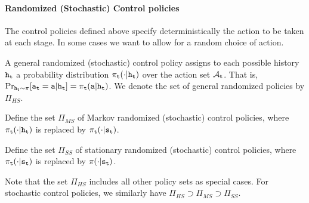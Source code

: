 \paragraph{Randomized (Stochastic) Control policies}
The control policies defined above specify deterministically the action to be taken at each stage. In some cases we want to allow for a random choice of action.

\begin{definition}
    A general randomized (stochastic) control policy assigns to each
possible history ${{\tt h}_{\tt t}}$ a probability distribution
${\pi _{\tt t}}( \cdot |{{\tt h}_{\tt t}})$ over the action set
${\mathcal{A}_{\tt t}}$. That is,  $\Pr_{{\tt h}_{\tt t}\sim \pi}[ {\tt a}_{\tt t} =
{\tt a}|{{\tt h}_{\tt t}}]  = {\pi
_{\tt t}}({\tt a}|{{\tt h}_{\tt t}})$. We denote the set of general
randomized policies by ${\Pi _{HS}}$.
\end{definition}
\begin{definition}
Define the set ${\Pi _{MS}}$ of Markov randomized (stochastic) control policies, where ${\pi _{\tt t}}( \cdot |{{\tt h}_{\tt t}})$ is replaced by ${\pi _{\tt t}}( \cdot |{{\tt s}_{\tt t}})$.
\end{definition}
\begin{definition}
Define the set ${\Pi _{SS}}$ of stationary randomized (stochastic) control policies, where ${\pi _{\tt t}}( \cdot |{{\tt s}_{\tt t}})$ is replaced by  $\pi ( \cdot |{{\tt s}_{\tt t}})$.
\end{definition}
Note that the set ${\Pi _{HS}}$ includes all other policy sets as special cases. For stochastic control policies, we similarly have ${\Pi _{HS}} \supset {\Pi _{MS}} \supset {\Pi _{SS}}$.



